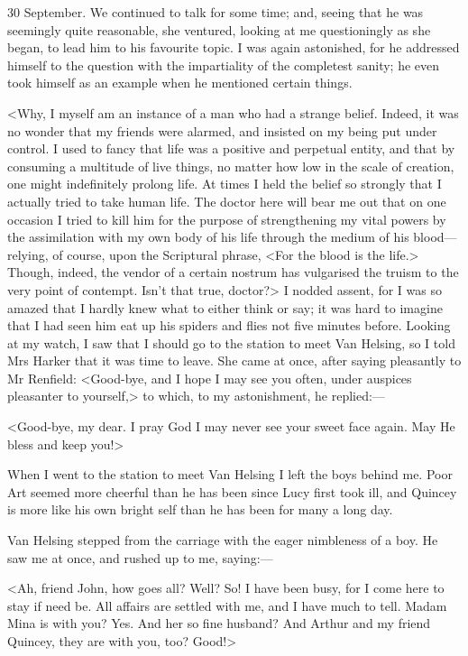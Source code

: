 \begin{diary}{30 September.}
We continued to talk for some time; and, seeing that he was seemingly quite reasonable, she ventured, looking at me questioningly as she began, to lead him to his favourite topic. I was again astonished, for he addressed himself to the question with the impartiality of the completest sanity; he even took himself as an example when he mentioned certain things.

<Why, I myself am an instance of a man who had a strange belief. Indeed, it was no wonder that my friends were alarmed, and insisted on my being put under control. I used to fancy that life was a positive and perpetual entity, and that by consuming a multitude of live things, no matter how low in the scale of creation, one might indefinitely prolong life. At times I held the belief so strongly that I actually tried to take human life. The doctor here will bear me out that on one occasion I tried to kill him for the purpose of strengthening my vital powers by the assimilation with my own body of his life through the medium of his blood—relying, of course, upon the Scriptural phrase, <For the blood is the life.> Though, indeed, the vendor of a certain nostrum has vulgarised the truism to the very point of contempt. Isn't that true, doctor?> I nodded assent, for I was so amazed that I hardly knew what to either think or say; it was hard to imagine that I had seen him eat up his spiders and flies not five minutes before. Looking at my watch, I saw that I should go to the station to meet Van Helsing, so I told Mrs Harker that it was time to leave. She came at once, after saying pleasantly to Mr Renfield: <Good-bye, and I hope I may see you often, under auspices pleasanter to yourself,> to which, to my astonishment, he replied:—

<Good-bye, my dear. I pray God I may never see your sweet face again. May He bless and keep you!>

When I went to the station to meet Van Helsing I left the boys behind me. Poor Art seemed more cheerful than he has been since Lucy first took ill, and Quincey is more like his own bright self than he has been for many a long day.

Van Helsing stepped from the carriage with the eager nimbleness of a boy. He saw me at once, and rushed up to me, saying:—

<Ah, friend John, how goes all? Well? So! I have been busy, for I come here to stay if need be. All affairs are settled with me, and I have much to tell. Madam Mina is with you? Yes. And her so fine husband? And Arthur and my friend Quincey, they are with you, too? Good!>


\end{diary}
